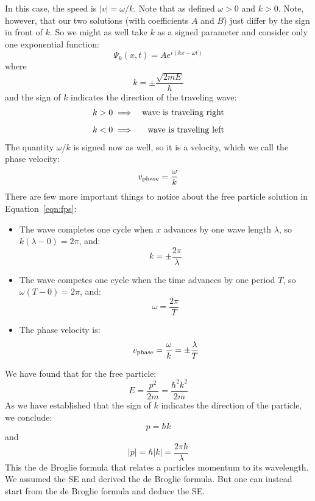 \documentclass[12pt]{book}
\begin{document}
In this case, the speed is $|v| = \omega/k$.  Note that as defined $\omega > 0$ and $k > 0$.
Note, however, that our two solutions (with coefficients $A$ and $B$) just differ by the sign in front of $k$.  So we might as well take $k$ as a signed parameter and consider only one exponential function:
\begin{equation}
\label{eqn:fps}
\Psi_k(x,t) = A e^{i (k x-\omega t)}
\end{equation}
where
\begin{equation}
k = \pm\frac{\sqrt{2mE}}{\hbar}
\end{equation}
and the sign of $k$ indicates the direction of the traveling wave:
\begin{eqnarray*}
k > 0 &\implies& {\rm wave~is~traveling~right} \\[5pt]
k < 0 &\implies& {\rm wave~is~traveling~left} \\
\end{eqnarray*}
The quantity $\omega/k$ is signed now as well, so it is a velocity, which we call the phase velocity:
\begin{equation}
v_{\rm phase} = \frac{\omega}{k}
\end{equation}
There are few more important things to notice about the free particle solution in Equation~\ref{eqn:fps}:
\begin{itemize}
\item The wave completes one cycle when $x$ advances by one wave length $\lambda$, so $k(\lambda-0) = 2\pi$, and:
$$k = \pm\frac{2\pi}{\lambda}$$
\item The wave competes one cycle when the time advances by one period $T$, so $\omega(T-0) = 2\pi$, and:
$$\omega = \frac{2\pi}{T}$$
\item The phase velocity is:
$$v_{\rm phase} = \frac{\omega}{k} = \pm \frac{\lambda}{T}$$
\end{itemize}
We have found that for the free particle:
$$E = \frac{p^2}{2m} = \frac{\hbar^2 k^2}{2m}$$
As we have established that the sign of $k$ indicates the direction of the particle, we conclude:
\begin{equation}
p = \hbar k 
\end{equation}
and
\begin{equation}
|p| = \hbar |k|  = \frac{2 \pi \hbar}{\lambda}
\end{equation}
This the de Broglie formula that relates a particles momentum to its wavelength.  We assumed the SE and derived the de Broglie formula.  But one can instead start from the de Broglie formula and deduce the SE.
\end{document}
